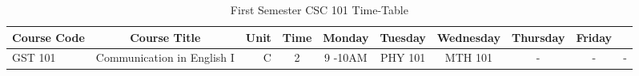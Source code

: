 \documentclass{article}
\begin{document}
	\begin{sidewaystable}[h!]
		\begin{center}
			\caption{First Semester CSC 101 Time-Table}
			\label{tab:table1}
			\begin{tabular}{l|c|r|c|c|c|c|c|c|c|}
			\textbf{Course Code} & \textbf{Course Title} & \textbf{Unit} & \textbf{Time} & \textbf{Monday} & \textbf{Tuesday} & \textbf{Wednesday} & \textbf{Thursday} & \textbf{Friday}\\
			\hline
			GST 101 & Communication in English I & C & 2 & 9 -10AM & PHY 101 & MTH 101 & - & - & - \\
			\end{tabular}
		\end{center}
	\end{sidewaystable}
\end{document}
